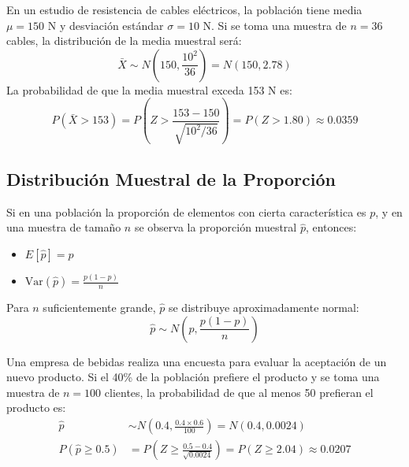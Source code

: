 \begin{example}
En un estudio de resistencia de cables eléctricos, la población tiene media $\mu = 150$ N y desviación estándar $\sigma = 10$ N. Si se toma una muestra de $n = 36$ cables, la distribución de la media muestral será:
\begin{equation}
\bar{X} \sim N\left(150, \frac{10^2}{36}\right) = N(150, 2.78)
\end{equation}
La probabilidad de que la media muestral exceda 153 N es:
\begin{equation}
P(\bar{X} > 153) = P\left(Z > \frac{153-150}{\sqrt{10^2/36}}\right) = P(Z > 1.80) \approx 0.0359
\end{equation}
\end{example}

\subsection{Distribución Muestral de la Proporción}

\begin{definition}
Si en una población la proporción de elementos con cierta característica es $p$, y en una muestra de tamaño $n$ se observa la proporción muestral $\hat{p}$, entonces:
\begin{itemize}
    \item $E[\hat{p}] = p$
    \item $\text{Var}(\hat{p}) = \frac{p(1-p)}{n}$
\end{itemize}
Para $n$ suficientemente grande, $\hat{p}$ se distribuye aproximadamente normal:
\begin{equation}
\hat{p} \sim N\left(p, \frac{p(1-p)}{n}\right)
\end{equation}
\end{definition}

\begin{example}
Una empresa de bebidas realiza una encuesta para evaluar la aceptación de un nuevo producto. Si el 40\% de la población prefiere el producto y se toma una muestra de $n = 100$ clientes, la probabilidad de que al menos 50 prefieran el producto es:
\begin{align}
\hat{p} &\sim N\left(0.4, \frac{0.4 \times 0.6}{100}\right) = N(0.4, 0.0024)\\
P(\hat{p} \geq 0.5) &= P\left(Z \geq \frac{0.5-0.4}{\sqrt{0.0024}}\right) = P(Z \geq 2.04) \approx 0.0207
\end{align}
\end{example}

